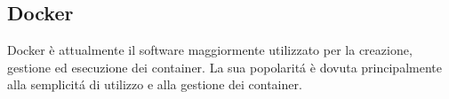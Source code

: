 \subsection{Docker}
\cite{docker}Docker è attualmente il software maggiormente utilizzato per la creazione, gestione ed esecuzione dei container. La sua popolaritá è dovuta principalmente alla semplicitá di utilizzo e alla gestione dei container.
